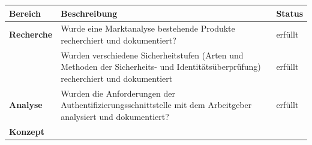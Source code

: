 \begin{longtable}[c]{@{}lll@{}}
\toprule
\begin{minipage}[b]{0.14\columnwidth}\raggedright\strut
\textbf{Bereich}
\strut\end{minipage} &
\begin{minipage}[b]{0.68\columnwidth}\raggedright\strut
\textbf{Beschreibung}
\strut\end{minipage} &
\begin{minipage}[b]{0.09\columnwidth}\raggedright\strut
\textbf{Status}
\strut\end{minipage}\tabularnewline
\midrule
\endhead
\begin{minipage}[t]{0.14\columnwidth}\raggedright\strut
\textbf{Recherche}
\strut\end{minipage} &
\begin{minipage}[t]{0.68\columnwidth}\raggedright\strut
Wurde eine Marktanalyse bestehende Produkte recherchiert und
dokumentiert?
\strut\end{minipage} &
\begin{minipage}[t]{0.09\columnwidth}\raggedright\strut
erfüllt
\strut\end{minipage}\tabularnewline
\begin{minipage}[t]{0.14\columnwidth}\raggedright\strut
\strut\end{minipage} &
\begin{minipage}[t]{0.68\columnwidth}\raggedright\strut
Wurden verschiedene Sicherheitstufen (Arten und Methoden der
Sicherheits- und Identitätsüberprüfung) recherchiert und dokumentiert
\strut\end{minipage} &
\begin{minipage}[t]{0.09\columnwidth}\raggedright\strut
erfüllt
\strut\end{minipage}\tabularnewline
\begin{minipage}[t]{0.14\columnwidth}\raggedright\strut
\textbf{Analyse}
\strut\end{minipage} &
\begin{minipage}[t]{0.68\columnwidth}\raggedright\strut
Wurden die Anforderungen der Authentifizierungsschnittstelle mit dem
Arbeitgeber analysiert und dokumentiert?
\strut\end{minipage} &
\begin{minipage}[t]{0.09\columnwidth}\raggedright\strut
erfüllt
\strut\end{minipage}\tabularnewline
\begin{minipage}[t]{0.14\columnwidth}\raggedright\strut
\textbf{Konzept}

\end{minipage}
\end{longtable}

